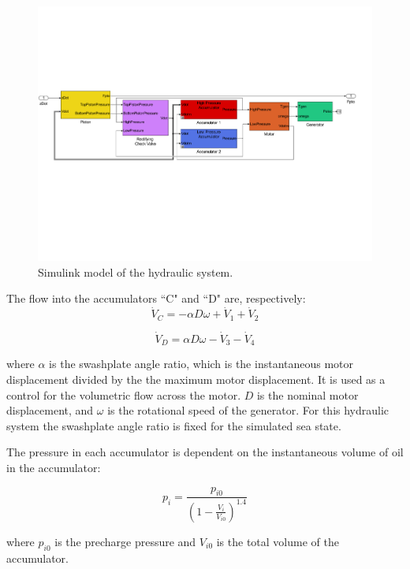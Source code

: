 \documentclass[twocolumn,10pt]{asme2e}
\begin{document}
\begin{figure}[t]	
    \centering
    \includegraphics[width=2\columnwidth]{Images/ptomodel_color}  
    \caption{Simulink model of the hydraulic system.}
    \label{Hyd}
    \end{figure}

The flow into the accumulators ``C" and ``D" are, respectively: 
\begin{equation}
\dot{V}_C=-\alpha D \omega+\dot{V}_1+\dot{V}_2 
\end{equation}

\begin{equation}
\dot{V}_D=\alpha D \omega-\dot{V}_3-\dot{V}_4 
\end{equation}

\noindent where $\alpha$ is the swashplate angle ratio, which is the instantaneous motor displacement divided by the the maximum motor displacement. It is used as a control for the volumetric flow across the motor. $D$ is the nominal motor displacement, and $\omega$ is the rotational speed of the generator. 
For this hydraulic system the swashplate angle ratio is fixed for the simulated sea state. 

The pressure in each accumulator is dependent on the instantaneous volume of oil in the accumulator:

\begin{equation}
p_i=\frac{p_{i0}}{(1-\frac{V_i}{V_{i0}})^{1.4}}
\end{equation}

\noindent where $p_{i0}$ is the precharge pressure and $V_{i0}$ is the total volume of the accumulator. 
\end{document}
